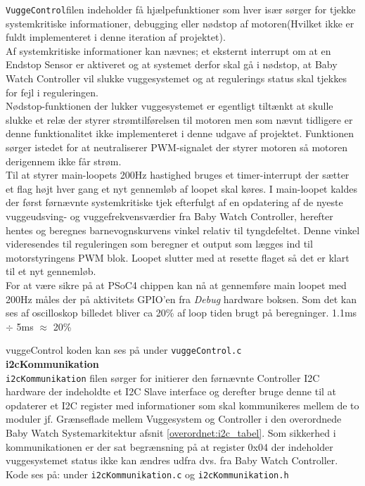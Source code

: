 \verb+VuggeControl+filen indeholder få hjælpefunktioner som hver især sørger for tjekke systemkritiske informationer, debugging eller nødstop af motoren(Hvilket ikke er fuldt implementeret i denne iteration af projektet). \\

Af systemkritiske informationer kan nævnes; et eksternt interrupt om at en Endstop Sensor er aktiveret og at systemet derfor skal gå i nødstop, at Baby Watch Controller vil slukke vuggesystemet og at regulerings status skal tjekkes for fejl i reguleringen.\\ 

Nødstop-funktionen der lukker vuggesystemet er egentligt tiltænkt at skulle slukke et relæ der styrer strømtilførelsen til motoren men som nævnt tidligere er denne funktionalitet ikke implementeret i denne udgave af projektet. Funktionen sørger istedet for at neutraliserer PWM-signalet der styrer motoren så motoren derigennem ikke får strøm. \\ 

Til at styrer main-loopets 200Hz hastighed bruges et timer-interrupt der sætter et flag højt hver gang et nyt gennemløb af loopet skal køres. I main-loopet kaldes der først førnævnte systemkritiske tjek efterfulgt af en opdatering af de nyeste vuggeudsving- og vuggefrekvensværdier fra Baby Watch Controller, herefter hentes og beregnes barnevognskurvens vinkel relativ til tyngdefeltet. Denne vinkel videresendes til reguleringen som beregner et output som lægges ind til motorstyringens PWM blok. Loopet slutter med at resette flaget så det er klart til et nyt gennemløb. \\
For at være sikre på at PSoC4 chippen kan nå at gennemføre main loopet med 200Hz måles der på aktivitets GPIO'en fra \textit{Debug} hardware boksen.
Som det kan ses af oscilloskop billedet bliver ca 20\% af loop tiden brugt på beregninger. 1.1ms $\div$ 5ms $\approx$ 20\%

vuggeControl koden kan ses på \citep{cd} under \verb+vuggeControl.c+ \\

\label{vugsys:impl, i2cKommunikation}\textbf{i2cKommunikation} \\ \verb+i2cKommunikation+ filen sørger for initierer den førnævnte Controller I2C hardware der indeholdte et I2C Slave interface og derefter bruge denne til at opdaterer et I2C register med informationer som skal kommunikeres mellem de to moduler jf. Grænseflade mellem Vuggesystem og Controller i den overordnede Baby Watch Systemarkitektur afsnit \ref{overordnet:i2c_tabel}. Som sikkerhed i kommunikationen er der sat begrænsning på at register 0x04 der indeholder vuggesystemet status ikke kan ændres udfra dvs. fra Baby Watch Controller. Kode ses på: \citep{cd} under \verb+i2cKommunikation.c+ og \verb+i2cKommunikation.h+\\

